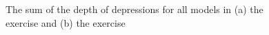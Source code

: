 \documentclass{isprs}
\begin{document}
\begin{figure}
\begin{center}
\caption{The sum of the depth of depressions for all models in (a) the  exercise and (b) the  exercise}
\label{fig:sum_depressions}
\end{center}
\end{figure}
%
\end{document}
